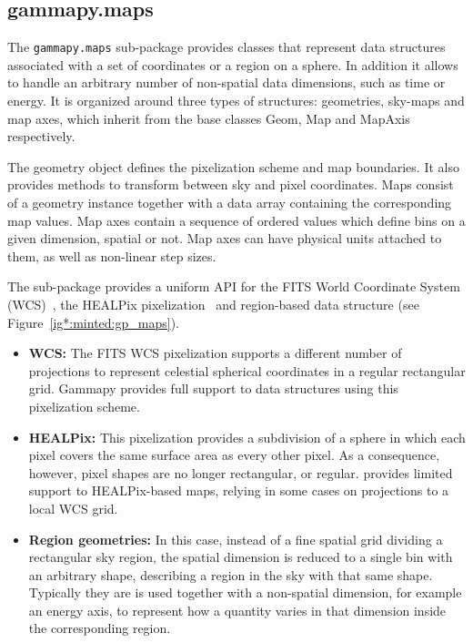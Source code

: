 \subsection{gammapy.maps}
\label{ssec:gammapy-maps}

The \verb|gammapy.maps| sub-package provides classes that represent data
structures associated with a set of coordinates or a region on a sphere. In
addition it allows to handle an arbitrary number of non-spatial data
dimensions, such as time or energy. It is organized around three types of
structures: geometries, sky-maps and map axes, which inherit from the base
classes Geom, Map and MapAxis respectively.

The geometry object defines the pixelization scheme and map boundaries. It also
provides methods to transform between sky and pixel coordinates. Maps consist
of a geometry instance together with a data array containing the corresponding
map values. Map axes contain a sequence of ordered values which define bins on
a given dimension, spatial or not. Map axes can have physical units attached to
them, as well as non-linear step sizes.

The sub-package provides a uniform API for the FITS World Coordinate System
(WCS)~\citep{Calabretta2002}, the HEALPix pixelization~\citep{Gorski2005} and
region-based data structure (see Figure~\ref{ig*:minted:gp_maps}).

\begin{itemize}
	\item \textbf{WCS: } The FITS WCS pixelization supports a different
	      number of projections to represent celestial spherical coordinates in a regular
	      rectangular grid. Gammapy provides full support to data structures using this
	      pixelization scheme.
	 \item \textbf{HEALPix: } This pixelization provides a
	      subdivision of a sphere in which each pixel covers the same surface area as
	      every other pixel. As a consequence, however, pixel shapes are no longer
	      rectangular, or regular. \gammapy provides limited support to HEALPix-based
	      maps, relying in some cases on projections to a local WCS grid. 
   \item \textbf{Region geometries: } In this case, instead of a fine spatial grid
	      dividing a rectangular sky region, the spatial dimension is reduced to a single
	      bin with an arbitrary shape, describing a region in the sky with that same
	      shape. Typically they are is used together with a non-spatial dimension, for
	      example an energy axis, to represent how a quantity varies in that dimension
	      inside the corresponding region. \end{itemize}

